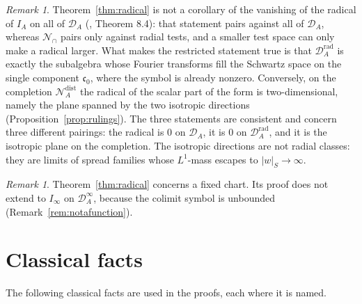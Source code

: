 \documentclass[11pt]{amsart}
\theoremstyle{definition}
\theoremstyle{remark}
\newtheorem{remark}[theorem]{Remark}
\newcommand{\DA}{\mathcal D_A}
\newcommand{\DAr}{\mathcal D_A^{\mathrm{rad}}}
\newcommand{\cz}{\mathfrak c_0}
\begin{document}
\begin{remark}
\label{rem:three}
Theorem~\ref{thm:radical} is not a corollary of the vanishing of the radical of
$I_A$ on all of $\DA$ (\cite{P43}, Theorem 8.4): that statement pairs against
all of $\DA$, whereas $\mathcal N_\cap$ pairs only against radial tests, and a
smaller test space can only make a radical larger.  What makes the restricted
statement true is that $\DAr$ is exactly the subalgebra whose Fourier transforms
fill the Schwartz space on the single component $\cz$, where the symbol is
already nonzero.  Conversely, on the completion
$\mathcal N_A^{\mathrm{dist}}$ the radical of the scalar part of the form is
two-dimensional, namely the plane spanned by the two isotropic directions
(Proposition~\ref{prop:rulings}).  The three statements are consistent and
concern three different pairings: the radical is $0$ on $\DA$, it is $0$ on
$\DAr$, and it is the isotropic plane on the completion.  The isotropic
directions are not radial classes: they are limits of spread families whose
$L^1$-mass escapes to $|w|_S\to\infty$.
\end{remark}

\begin{remark}
\label{rem:nocolimit}
Theorem~\ref{thm:radical} concerns a fixed chart.  Its proof does not extend
to $I_\infty$ on $\DA^\infty$, because the colimit symbol is unbounded
(Remark~\ref{rem:notafunction}).
\end{remark}

\appendix

\section{Classical facts}
\label{app:classical}

The following classical facts are used in the proofs, each where it is
named.
\end{document}
